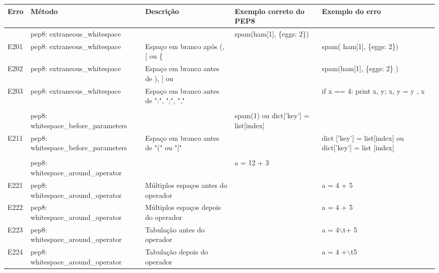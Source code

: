 	\begin{landscape}
		\begin{table}
			\tiny
			\begin{tabularx}{\linewidth}{ |p{0.5cm}|p{6cm}|p{5.5cm}|X|X|}
				\hline
				\textbf{Erro}
				& \textbf{Método}
				& \textbf{Descrição}
				& \textbf{Exemplo correto do PEP8}
				& \textbf{Exemplo do erro} \\
				\hline
				
				
				& pep8: extraneous\_whitespace 
				&   
				& spam(ham[1], \{eggs: 2\}) 
				&  \\ 
				\hline
				E201 
				& pep8: extraneous\_whitespace 
				& Espaço em branco após (, [ ou \{ 
				&   
				& spam( ham[1], \{eggs: 2\}) \\ 
				\hline
				E202 
				& pep8: extraneous\_whitespace 
				& Espaço em branco antes de ), ] ou   
				&   
				& spam(ham[1], \{eggs: 2\} ) \\ 
				\hline
				E203 
				& pep8: extraneous\_whitespace 
				& Espaço em branco antes de ":", ";", "," 
				&   
				& if x == 4: print x, y; x, y = y , x \\ 
				\hline
				
				&   
				&   
				&   
				&  \\ 
				\hline
				
				& pep8: whitespace\_before\_parameters 
				&   
				& spam(1) ou dict['key'] = list[index]  
				&  \\ 
				\hline
				E211 
				& pep8: whitespace\_before\_parameters 
				& Espaço em branco antes de "(" ou "[" 
				&   
				& dict ['key'] = list[index] ou dict['key'] = list [index] \\ 
				\hline
				
				&   
				&   
				&   
				&  \\ 
				\hline
				
				& pep8: whitespace\_around\_operator 
				&   
				& a = 12 + 3  
				&  \\ 
				\hline
				E221 
				& pep8: whitespace\_around\_operator 
				& Múltiplos espaços antes do operador 
				&   
				& a = 4  + 5 \\ 
				\hline
				E222 
				& pep8: whitespace\_around\_operator 
				& Múltiplos espaços depois do operador 
				&   
				& a = 4 +  5 \\ 
				\hline
				E223 
				& pep8: whitespace\_around\_operator 
				& Tabulação antes do operador 
				&   
				& a = 4$\backslash$t+ 5 \\ 
				\hline
				E224 
				& pep8: whitespace\_around\_operator 
				& Tabulação depois do operador 
				&   
				& a = 4 +$\backslash$t5 \\ 
				\hline
				

\end{tabularx}
\end{table}
\end{landscape}

